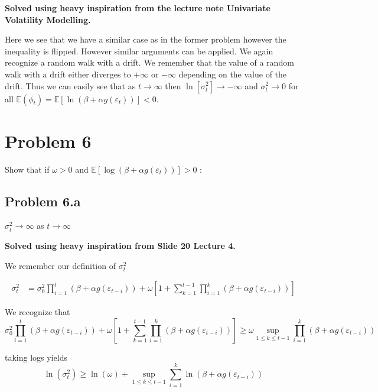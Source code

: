 \documentclass{EconHomework}
\begin{document}
\textbf{Solved using heavy inspiration from the lecture note Univariate Volatility Modelling.}

\bigskip

Here we see that we have a similar case as in the former problem however
the inequality is flipped. However similar arguments can be applied.
We again recognize a random walk with a drift. We remember that the
value of a random walk with a drift either diverges to $+\infty$
or $-\infty$ depending on the value of the drift. Thus we can easily
see that as $t\rightarrow\infty$ then $\ln\left[\sigma_{t}^{2}\right]\rightarrow-\infty$
and $\sigma_{t}^{2}\rightarrow0$ for all $\mathbb{E}\left(\phi_{t}\right)=\mathbb{E}\left[\ln\left(\beta+\alpha g\left(\varepsilon_{t}\right)\right)\right]<0$.


\section{Problem 6}

Show that if $\omega>0$ and $\mathbb{E}\left[\log\left(\beta+\alpha g\left(\varepsilon_{t}\right)\right)\right]>0$
:

\subsection{Problem 6.a}
\begin{tcolorbox}[colback=white]
    $\sigma_{t}^{2}\rightarrow\infty$ as $t\rightarrow\infty$
\end{tcolorbox}

\textbf{Solved using heavy inspiration from Slide 20 Lecture 4.}

\bigskip

We remember our definition of $\sigma_{t}^{2}$

\begin{align*}
\sigma_{t}^{2} & =\sigma_{0}^{2}\prod_{i=1}^{t}\left(\beta+\alpha g\left(\varepsilon_{t-i}\right)\right)+\omega\left[1+\sum_{k=1}^{t-1}\prod_{i=1}^{k}\left(\beta+\alpha g\left(\varepsilon_{t-i}\right)\right)\right]
\end{align*}

We recognize that 
\[
\sigma_{0}^{2}\prod_{i=1}^{t}\left(\beta+\alpha g\left(\varepsilon_{t-i}\right)\right)+\omega\left[1+\sum_{k=1}^{t-1}\prod_{i=1}^{k}\left(\beta+\alpha g\left(\varepsilon_{t-i}\right)\right)\right]\geq\omega\sup_{1\leq k\leq t-1}\prod_{i=1}^{k}\left(\beta+\alpha g\left(\varepsilon_{t-i}\right)\right)
\]

taking logs yields
\[
\ln\left(\sigma_{t}^{2}\right)\geq\ln\left(\omega\right)+\sup_{1\leq k\leq t-1}\sum_{i=1}^{k}\ln\left(\beta+\alpha g\left(\varepsilon_{t-i}\right)\right)
\]
\end{document}
